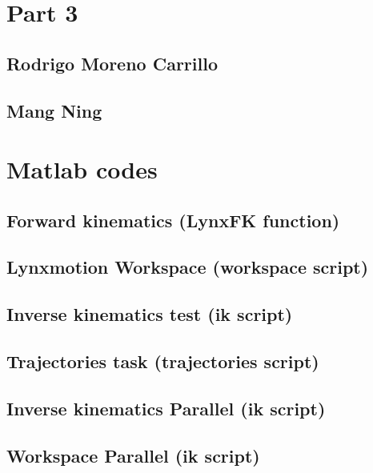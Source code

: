 \documentclass{article}
\begin{document}
\section{Part 3}
\subsection{Rodrigo Moreno Carrillo}


\subsection{Mang Ning}


\appendix
\section{Matlab codes}
\subsection{Forward kinematics (LynxFK function)}
\label{apendix:LynxFK}


\subsection{Lynxmotion Workspace (workspace script)}
\label{apendix:lynx_workspace}


\subsection{Inverse kinematics test (ik script)}
\label{apendix:lynx_ik_test}


\subsection{Trajectories task (trajectories script)}
\label{apendix:trajectories_script}


\subsection{Inverse kinematics Parallel (ik script)}
\label{apendix:parallel_ik_test}


\subsection{Workspace Parallel (ik script)}
\label{apendix:parallel_workspace}

\end{document}
